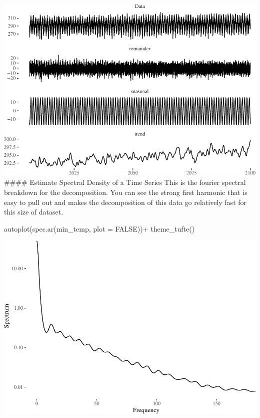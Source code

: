 \documentclass[
  paper=a4,
  ,captions=tableheading
]{scrartcl}
\newenvironment{Shaded}{\begin{snugshade}}{\end{snugshade}}
\newcommand{\AttributeTok}[1]{\textcolor[rgb]{0.77,0.63,0.00}{#1}}
\newcommand{\ConstantTok}[1]{\textcolor[rgb]{0.00,0.00,0.00}{#1}}
\newcommand{\FunctionTok}[1]{\textcolor[rgb]{0.00,0.00,0.00}{#1}}
\newcommand{\NormalTok}[1]{#1}
\newcommand{\SpecialCharTok}[1]{\textcolor[rgb]{0.00,0.00,0.00}{#1}}
\begin{document}
\includegraphics{Haskell_files/figure-latex/unnamed-chunk-55-1.pdf}
\#\#\#\# Estimate Spectral Density of a Time Series This is the fourier
spectral breakdown for the decomposition. You can see the strong first
harmonic that is easy to pull out and makes the decomposition of this
data go relatively fast for this size of dataset.

\begin{Shaded}
\begin{Highlighting}[]
\FunctionTok{autoplot}\NormalTok{(}\FunctionTok{spec.ar}\NormalTok{(min\_temp, }\AttributeTok{plot =} \ConstantTok{FALSE}\NormalTok{))}\SpecialCharTok{+} \FunctionTok{theme\_tufte}\NormalTok{()}
\end{Highlighting}
\end{Shaded}

\includegraphics{Haskell_files/figure-latex/unnamed-chunk-56-1.pdf}
\end{document}
